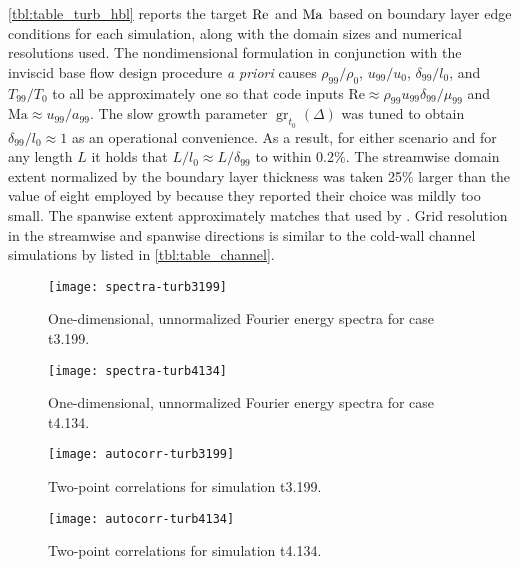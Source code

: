 \autoref{tbl:table_turb_hbl} reports the target $\mbox{Re}_{}$ and $\mbox{Ma}_{}$ based on
boundary layer edge conditions for each simulation, along with the domain sizes
and numerical resolutions used.
%
The nondimensional formulation in conjunction with the inviscid
base flow design procedure \emph{a priori} causes $\rho_{99}
/ \rho_0$, $u_{99} / u_0$, $\delta_{99} / l_0$, and $T_{99} /
T_0$ to all be approximately one so that code inputs $\textrm{Re}
\approx \rho_{99} u_{99} \delta_{99} / \mu_{99}$ and $\textrm{Ma}
\approx u_{99} / a_{99}$.  The slow growth
parameter $\operatorname{gr}_{t_0}\!\left(\Delta\right)$ was tuned to obtain
$\delta_{99}/l_0\approx{}1$ as an operational convenience.  As a result,
for either scenario and for
any length $L$ it holds that $L / l_0 \approx L / \delta_{99}$ to
within 0.2\%.  The streamwise domain extent normalized by the boundary
layer thickness was taken 25\% larger than the value of eight employed by
\citet{Guarini2000Direct} because they reported their choice was mildly
too small.  The spanwise extent approximately matches that used by
\citet{Spalart1988Direct}.  Grid resolution in the streamwise and
spanwise directions is similar to the cold-wall channel simulations by
\citet{Coleman1995Numerical} listed in \autoref{tbl:table_channel}.

\begin{figure}
\centering
\texttt{[image: spectra-turb3199]}
\caption{%
    One-dimensional, unnormalized Fourier energy spectra for case
    t3.199.\label{fig:spectra-t3199}
}
\end{figure}

\begin{figure}
\centering
\texttt{[image: spectra-turb4134]}
\caption{%
    One-dimensional, unnormalized Fourier energy spectra for case
    t4.134.\label{fig:spectra-t4134}
}
\end{figure}

\begin{figure}
\centering
\texttt{[image: autocorr-turb3199]}
\caption{%
    Two-point correlations for simulation t3.199.\label{fig:autocorr-t3199}
}
\end{figure}

\begin{figure}
\centering
\texttt{[image: autocorr-turb4134]}
\caption{%
    Two-point correlations for simulation t4.134.\label{fig:autocorr-t4134}
}
\end{figure}

